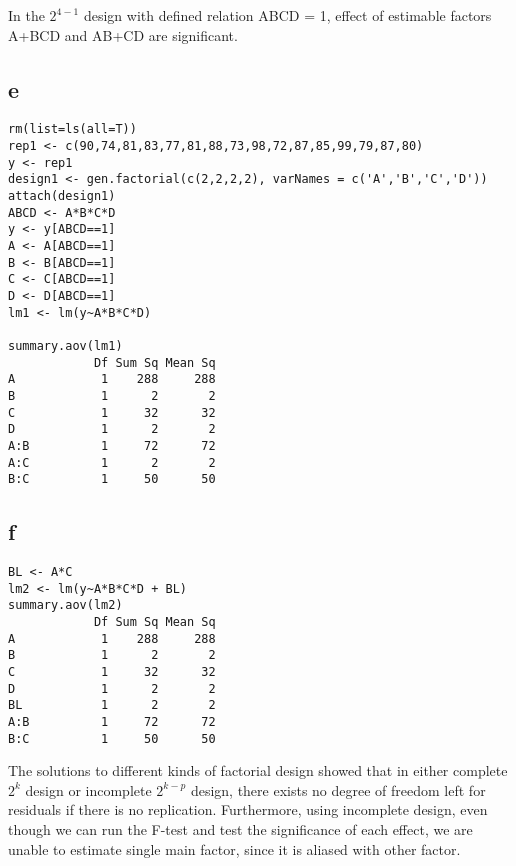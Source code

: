 \documentclass[11pt,letterpaper]{article}
\begin{document}
\noindent In the $2^{4-1}$ design with defined relation ABCD = 1, effect of estimable factors A+BCD and AB+CD are significant. 

\subsection*{e}
\begin{verbatim}
rm(list=ls(all=T))
rep1 <- c(90,74,81,83,77,81,88,73,98,72,87,85,99,79,87,80)
y <- rep1
design1 <- gen.factorial(c(2,2,2,2), varNames = c('A','B','C','D'))
attach(design1)
ABCD <- A*B*C*D
y <- y[ABCD==1]
A <- A[ABCD==1]
B <- B[ABCD==1]
C <- C[ABCD==1]
D <- D[ABCD==1]
lm1 <- lm(y~A*B*C*D)

summary.aov(lm1)
            Df Sum Sq Mean Sq
A            1    288     288
B            1      2       2
C            1     32      32
D            1      2       2
A:B          1     72      72
A:C          1      2       2
B:C          1     50      50

\end{verbatim}

\subsection*{f}
\begin{verbatim}
BL <- A*C
lm2 <- lm(y~A*B*C*D + BL)
summary.aov(lm2)
            Df Sum Sq Mean Sq
A            1    288     288
B            1      2       2
C            1     32      32
D            1      2       2
BL           1      2       2
A:B          1     72      72
B:C          1     50      50
\end{verbatim}

\noindent The solutions to different kinds of factorial design showed that in either complete $2^k$ design or incomplete $2^{k-p}$ design, there exists no degree of freedom left for residuals if there is no replication. Furthermore, using incomplete design, even though we can run the F-test and test the significance of each effect, we are unable to estimate single main factor, since it is aliased with other factor. 
\end{document}
